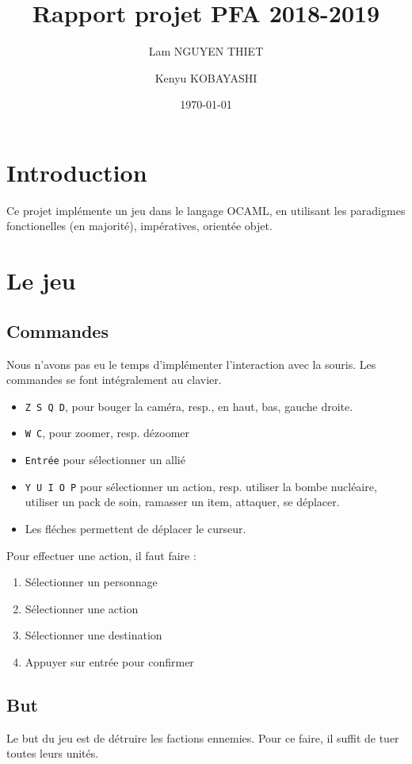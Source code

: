 \documentclass{article}
\title{Rapport projet PFA 2018-2019}
\date{\today}
\author{Lam NGUYEN THIET
\and Kenyu KOBAYASHI}
\begin{document}
\maketitle
\tableofcontents
\newpage
\newpage
\section{Introduction}
Ce projet implémente un jeu dans le langage OCAML, en utilisant les paradigmes fonctionelles (en majorité), impératives, orientée objet.

\section{Le jeu}
\subsection{Commandes}
Nous n'avons pas eu le temps d'implémenter l'interaction avec la souris. Les commandes se font intégralement
au clavier.
\begin{itemize}
    \item \texttt{Z S Q D}, pour bouger la caméra, resp., en haut, bas, gauche droite.
    \item \texttt{W C}, pour zoomer, resp. dézoomer
    \item \texttt{Entrée} pour sélectionner un allié
    \item \texttt{Y U I O P} pour sélectionner un action, resp. utiliser la bombe nucléaire, utiliser un pack de soin, ramasser un item, attaquer, se déplacer.
    \item Les fléches permettent de déplacer le curseur.
\end{itemize}

Pour effectuer une action, il faut faire :
\begin{enumerate}
    \item Sélectionner un personnage
    \item Sélectionner une action
    \item Sélectionner une destination
    \item Appuyer sur entrée pour confirmer
\end{enumerate}

\subsection{But}
Le but du jeu est de détruire les factions ennemies. Pour ce faire, il suffit de tuer toutes leurs unités.
\end{document}
